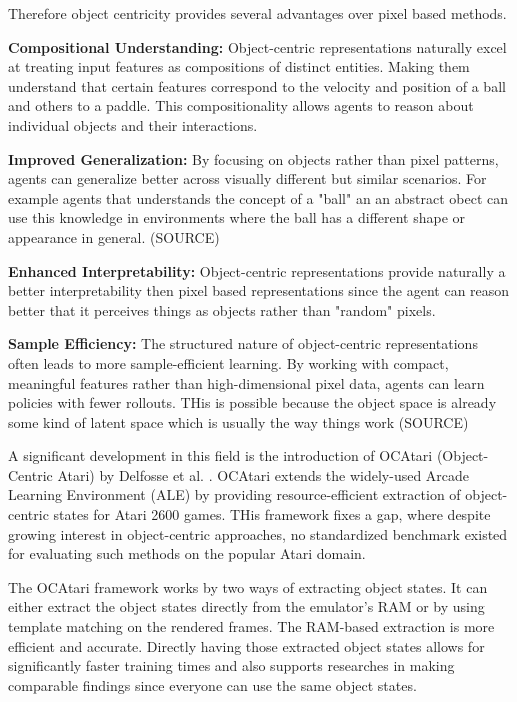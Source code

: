 \documentclass[
	english,
	ruledheaders=section,
	class=report,
	thesis={type=master},
	accentcolor=9c,
	custommargins=true,
	marginpar=false,
	parskip=half-,
	fontsize=11pt,
]{tudapub}
\begin{document}
Therefore object centricity provides several advantages over pixel based
methods.

\textbf{Compositional Understanding:} Object-centric representations naturally excel at treating input features as compositions of distinct entities. Making them understand that certain features
correspond to the velocity and position of a ball and others to a paddle. This compositionality allows agents to reason about individual objects and their interactions.

\textbf{Improved Generalization:} By focusing on objects rather than pixel patterns, agents can generalize better across visually different but similar scenarios. For example agents that
understands the concept of a "ball" an an abstract obect can use this knowledge in environments where the ball has a different shape or appearance in general. (SOURCE)

\textbf{Enhanced Interpretability:} Object-centric representations provide naturally a better interpretability then pixel based representations since the agent can reason better that it perceives things as objects rather than "random" pixels.

\textbf{Sample Efficiency:} The structured nature of object-centric representations often leads to more sample-efficient learning. By working with compact, meaningful features rather than high-dimensional
pixel data, agents can learn policies with fewer rollouts. THis is possible because the object space is already some kind of latent space which is usually the way things work (SOURCE)

A significant development in this field is the introduction of OCAtari
(Object-Centric Atari) by Delfosse et al.
\cite{delfosse2024ocatariobjectcentricatari2600}. OCAtari extends the
widely-used Arcade Learning Environment (ALE) by providing resource-efficient
extraction of object-centric states for Atari 2600 games. THis framework fixes
a gap, where despite growing interest in object-centric approaches, no
standardized benchmark existed for evaluating such methods on the popular Atari
domain.

The OCAtari framework works by two ways of extracting object states. It can
either extract the object states directly from the emulator's RAM or by using
template matching on the rendered frames. The RAM-based extraction is more
efficient and accurate. Directly having those extracted object states allows
for significantly faster training times and also supports researches in making
comparable findings since everyone can use the same object states.
\end{document}
